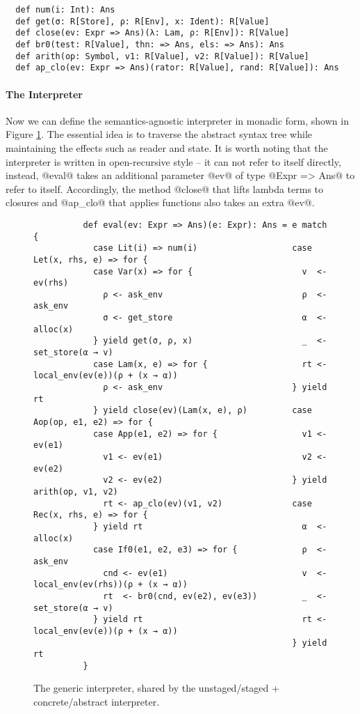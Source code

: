 
\begin{lstlisting}
  def num(i: Int): Ans
  def get(σ: R[Store], ρ: R[Env], x: Ident): R[Value]
  def close(ev: Expr => Ans)(λ: Lam, ρ: R[Env]): R[Value]
  def br0(test: R[Value], thn: => Ans, els: => Ans): Ans
  def arith(op: Symbol, v1: R[Value], v2: R[Value]): R[Value]
  def ap_clo(ev: Expr => Ans)(rator: R[Value], rand: R[Value]): Ans
\end{lstlisting}

\paragraph{The Interpreter} Now we can define the semantics-agnostic interpreter
in monadic form, shown in Figure \ref{fig:shared_int}.
The essential idea is to traverse the abstract syntax tree while maintaining the
effects such as reader and state.
It is worth noting that the interpreter is written in open-recursive style -- it
can not refer to itself directly, instead, @eval@ takes an additional parameter
@ev@ of type @Expr => Ans@ to refer to itself. Accordingly, the method @close@
that lifts lambda terms to closures and @ap_clo@ that applies functions also
takes an extra @ev@.

\begin{figure}[h!]
  \centering
  \begin{lstlisting}
          def eval(ev: Expr => Ans)(e: Expr): Ans = e match {
            case Lit(i) => num(i)                   case Let(x, rhs, e) => for {
            case Var(x) => for {                      v  <- ev(rhs)
              ρ <- ask_env                            ρ  <- ask_env
              σ <- get_store                          α  <- alloc(x)
            } yield get(σ, ρ, x)                      _  <- set_store(α → v)
            case Lam(x, e) => for {                   rt <- local_env(ev(e))(ρ + (x → α))
              ρ <- ask_env                          } yield rt
            } yield close(ev)(Lam(x, e), ρ)         case Aop(op, e1, e2) => for {
            case App(e1, e2) => for {                 v1 <- ev(e1)                                               
              v1 <- ev(e1)                            v2 <- ev(e2)
              v2 <- ev(e2)                          } yield arith(op, v1, v2)
              rt <- ap_clo(ev)(v1, v2)              case Rec(x, rhs, e) => for {
            } yield rt                                α  <- alloc(x)
            case If0(e1, e2, e3) => for {             ρ  <- ask_env
              cnd <- ev(e1)                           v  <- local_env(ev(rhs))(ρ + (x → α))
              rt  <- br0(cnd, ev(e2), ev(e3))         _  <- set_store(α → v)
            } yield rt                                rt <- local_env(ev(e))(ρ + (x → α))
                                                    } yield rt                    
          }
  \end{lstlisting}
\caption{The generic interpreter,
  shared by the unstaged/staged + concrete/abstract interpreter.}
\label{fig:shared_int}
\end{figure}

